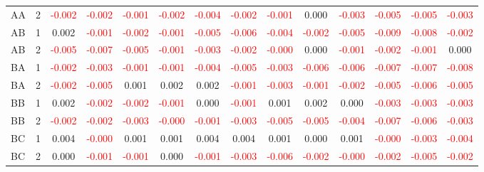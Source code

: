 \begin{table}[!htb]
{\begin{tabular}{llcccccccccccc}
AA & 2 & \textcolor{red}{-0.002} & \textcolor{red}{-0.002} & \textcolor{red}{-0.001} & \textcolor{red}{-0.002} & \textcolor{red}{-0.004} & \textcolor{red}{-0.002} & \textcolor{red}{-0.001} & 0.000 & \textcolor{red}{-0.003} & \textcolor{red}{-0.005} & \textcolor{red}{-0.005} & \textcolor{red}{-0.003}\\
AB & 1 & 0.002 & \textcolor{red}{-0.001} & \textcolor{red}{-0.002} & \textcolor{red}{-0.001} & \textcolor{red}{-0.005} & \textcolor{red}{-0.006} & \textcolor{red}{-0.004} & \textcolor{red}{-0.002} & \textcolor{red}{-0.005} & \textcolor{red}{-0.009} & \textcolor{red}{-0.008} & \textcolor{red}{-0.002}\\
AB & 2 & \textcolor{red}{-0.005} & \textcolor{red}{-0.007} & \textcolor{red}{-0.005} & \textcolor{red}{-0.001} & \textcolor{red}{-0.003} & \textcolor{red}{-0.002} & \textcolor{red}{-0.000} & 0.000 & \textcolor{red}{-0.001} & \textcolor{red}{-0.002} & \textcolor{red}{-0.001} & 0.000\\
BA & 1 & \textcolor{red}{-0.002} & \textcolor{red}{-0.003} & \textcolor{red}{-0.001} & \textcolor{red}{-0.001} & \textcolor{red}{-0.004} & \textcolor{red}{-0.005} & \textcolor{red}{-0.003} & \textcolor{red}{-0.006} & \textcolor{red}{-0.006} & \textcolor{red}{-0.007} & \textcolor{red}{-0.007} & \textcolor{red}{-0.008}\\
BA & 2 & \textcolor{red}{-0.002} & \textcolor{red}{-0.005} & 0.001 & 0.002 & 0.002 & \textcolor{red}{-0.001} & \textcolor{red}{-0.003} & \textcolor{red}{-0.001} & \textcolor{red}{-0.002} & \textcolor{red}{-0.005} & \textcolor{red}{-0.006} & \textcolor{red}{-0.005}\\
BB & 1 & 0.002 & \textcolor{red}{-0.002} & \textcolor{red}{-0.002} & \textcolor{red}{-0.001} & 0.000 & \textcolor{red}{-0.001} & 0.001 & 0.002 & 0.000 & \textcolor{red}{-0.003} & \textcolor{red}{-0.003} & \textcolor{red}{-0.003}\\
BB & 2 & \textcolor{red}{-0.002} & \textcolor{red}{-0.002} & \textcolor{red}{-0.003} & \textcolor{red}{-0.000} & \textcolor{red}{-0.001} & \textcolor{red}{-0.003} & \textcolor{red}{-0.005} & \textcolor{red}{-0.005} & \textcolor{red}{-0.004} & \textcolor{red}{-0.007} & \textcolor{red}{-0.006} & \textcolor{red}{-0.003}\\
BC & 1 & 0.004 & \textcolor{red}{-0.000} & 0.001 & 0.001 & 0.004 & 0.004 & 0.001 & 0.000 & 0.001 & \textcolor{red}{-0.000} & \textcolor{red}{-0.003} & \textcolor{red}{-0.004}\\
BC & 2 & 0.000 & \textcolor{red}{-0.001} & \textcolor{red}{-0.001} & 0.000 & \textcolor{red}{-0.001} & \textcolor{red}{-0.003} & \textcolor{red}{-0.006} & \textcolor{red}{-0.002} & \textcolor{red}{-0.000} & \textcolor{red}{-0.002} & \textcolor{red}{-0.005} & \textcolor{red}{-0.002}\\

\end{tabular}}
\end{table}
